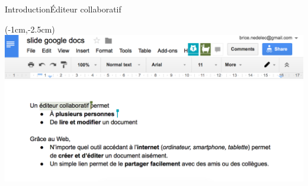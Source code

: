 \begin{frame}{Introduction}{Éditeur collaboratif}
    
  
  \begin{textblock*}{\textwidth}(-1cm,-2.5cm) 
    \includegraphics[width=1.19\textwidth]{img/googledocs3.png}
  \end{textblock*}


\end{frame}
